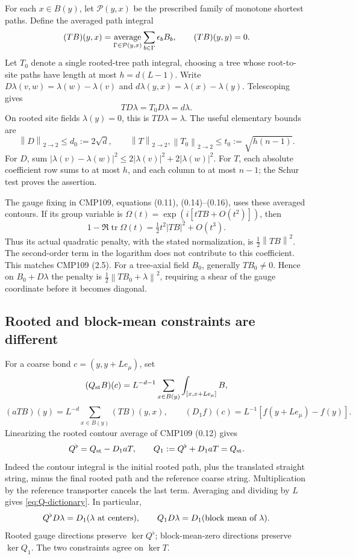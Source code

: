 \documentclass[11pt]{article}
\theoremstyle{remark}
\newcommand{\norm}[1]{\left\|#1\right\|}
\newcommand{\tr}{\operatorname{tr}}
\begin{document}
For each $x\in B(y)$, let $\mathcal P(y,x)$ be the prescribed family
of monotone shortest paths. Define the averaged path integral
\[
 (TB)(y,x)=\mathop{\rm average}_{\Gamma\in\mathcal P(y,x)}
                 \sum_{b\in\Gamma}\epsilon_b B_b,
 \qquad (TB)(y,y)=0.
\]
Let $T_0$ denote a single rooted-tree path integral, choosing a tree
whose root-to-site paths have length at most $h=d(L-1)$. Write
$D\lambda(v,w)=\lambda(w)-\lambda(v)$ and
$d\lambda(y,x)=\lambda(x)-\lambda(y)$. Telescoping gives
\begin{equation}\label{eq:telescoping}
 TD\lambda=T_0D\lambda=d\lambda.
\end{equation}
On rooted site fields $\lambda(y)=0$, this is $TD\lambda=\lambda$.
The useful elementary bounds are
\begin{equation}\label{eq:TD-bounds}
 \norm D_{2\to2}\le d_0:=2\sqrt d,\qquad
 \norm T_{2\to2},\norm{T_0}_{2\to2}
       \le t_0:=\sqrt{h(n-1)}.
\end{equation}
For $D$, sum $|\lambda(v)-\lambda(w)|^2\le
2|\lambda(v)|^2+2|\lambda(w)|^2$. For $T$, each absolute
coefficient row sums to at most $h$, and each column to at most
$n-1$; the Schur test proves the assertion.

The gauge fixing in CMP109, equations (0.11), (0.14)--(0.16), uses
these averaged contours. If its group variable is
$\Omega(t)=\exp(i[tTB+O(t^2)])$, then
\[
 1-\Re\tr\Omega(t)=\tfrac12t^2|TB|^2+O(t^3).
\]
Thus its actual quadratic penalty, with the stated normalization,
is $\tfrac12\norm{TB}^2$. The second-order term in the logarithm
does not contribute to this coefficient. This matches CMP109 (2.5).
For a tree-axial field $B_0$, generally $TB_0\ne0$. Hence on
$B_0+D\lambda$ the penalty is
$\tfrac12\norm{TB_0+\lambda}^2$, requiring a shear of the
gauge coordinate before it becomes diagonal.

\subsection{Rooted and block-mean constraints are different}

For a coarse bond $c=(y,y+Le_\mu)$, set
\[
 (Q_{\rm st}B)(c)=L^{-d-1}\sum_{x\in B(y)}
                         \int_{[x,x+Le_\mu]} B,
\]
\[
 (aTB)(y)=L^{-d}\sum_{x\in B(y)}(TB)(y,x),\qquad
 (D_1f)(c)=L^{-1}[f(y+Le_\mu)-f(y)].
\]
Linearizing the rooted contour average of CMP109 (0.12) gives
\begin{equation}\label{eq:Q-dictionary}
 Q^\flat=Q_{\rm st}-D_1aT,\qquad
 Q_1:=Q^\flat+D_1aT=Q_{\rm st}.
\end{equation}
Indeed the contour integral is the initial rooted path, plus the
translated straight string, minus the final rooted path and the
reference coarse string. Multiplication by the reference transporter
cancels the last term. Averaging and dividing by $L$ gives
\eqref{eq:Q-dictionary}. In particular,
\begin{equation}\label{eq:Q-gauge}
 Q^\flat D\lambda=D_1(\lambda\hbox{ at centers}),\qquad
 Q_1D\lambda=D_1(\hbox{block mean of }\lambda).
\end{equation}
Rooted gauge directions preserve $\ker Q^\flat$; block-mean-zero
directions preserve $\ker Q_1$. The two constraints agree on $\ker T$.
\end{document}
